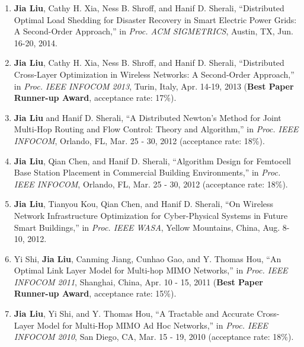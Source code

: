 \documentclass[overlapped,line,letterpaper]{res1}
\begin{document}
\begin{resume}
\begin{enumerate}
\vspace*{.08in} \item \textbf{Jia Liu}, Cathy H. Xia, Ness B. Shroff, and Hanif D. Sherali, ``Distributed Optimal Load Shedding for Disaster Recovery in Smart Electric Power Grids: A Second-Order Approach,'' in {\em Proc. ACM SIGMETRICS}, Austin, TX, Jun. 16-20, 2014.

\vspace*{.08in} \item \textbf{Jia Liu}, Cathy H. Xia, Ness B. Shroff, and Hanif D. Sherali, ``Distributed Cross-Layer Optimization in Wireless Networks: A Second-Order Approach,'' in {\em Proc. IEEE INFOCOM 2013}, Turin, Italy, Apr. 14-19, 2013 ({\bf Best Paper Runner-up Award}, acceptance rate: 17\%).

\vspace*{.08in} \item \textbf{Jia Liu} and Hanif D. Sherali, ``A Distributed Newton's Method for Joint Multi-Hop Routing and Flow Control: Theory and Algorithm,'' in {\em Proc. IEEE INFOCOM}, Orlando, FL, Mar. 25 - 30, 2012 (acceptance rate: 18\%).

\vspace*{.08in} \item \textbf{Jia Liu}, Qian Chen, and Hanif D. Sherali, ``Algorithm Design for Femtocell Base Station Placement in Commercial Building Environments,'' in {\em Proc. IEEE INFOCOM}, Orlando, FL, Mar. 25 - 30, 2012  (acceptance rate: 18\%).

\vspace*{.08in} \item \textbf{Jia Liu}, Tianyou Kou, Qian Chen, and Hanif D. Sherali, ``On Wireless Network Infrastructure Optimization for Cyber-Physical Systems in Future Smart Buildings,'' in {\em Proc. IEEE WASA}, Yellow Mountains, China, Aug. 8-10, 2012.


\vspace*{.08in} \item Yi Shi, \textbf{Jia Liu}, Canming Jiang, Cunhao Gao, and Y. Thomas Hou, ``An Optimal Link Layer Model for Multi-hop MIMO Networks,'' in {\em Proc. IEEE INFOCOM 2011}, Shanghai, China, Apr. 10 - 15, 2011 ({\bf Best Paper Runner-up Award}, acceptance rate: 15\%).

\vspace*{.08in} \item \textbf{Jia Liu}, Yi Shi, and Y. Thomas Hou, ``A Tractable and Accurate Cross-Layer Model for Multi-Hop MIMO Ad Hoc Networks,'' in {\em Proc. IEEE INFOCOM 2010}, San Diego, CA, Mar. 15 - 19, 2010 (acceptance rate: 18\%).


\end{enumerate}
\end{resume}
\end{document}
